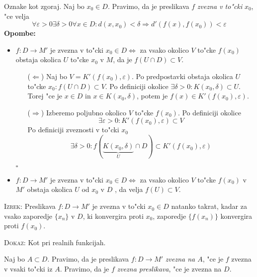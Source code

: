  Oznake kot zgoraj. Naj bo $x_0 \in D$. Pravimo, da je preslikava $f$ \emph{zvezna v to"cki} $x_0$, "ce velja
\begin{equation*}
\forall \varepsilon > 0 \exists \delta > 0 \forall x \in D: d(x, x_0) < \delta \Rightarrow d'(f(x), f(x_0)) < \varepsilon
\end{equation*}
\textbf{Opombe:}
\begin{itemize}
    \item $f: D \to M'$ je zvezna v to"cki $x_0 \in D \iff$ za vsako okolico $V$ to"cke $f(x_0)$ obstaja okolica $U$ to"cke $x_0$ v $M$, da je $f(U \cap D) \subset V$.
    \begin{itemize}
        \item[($\Leftarrow$)] Naj bo $V = K'(f(x_0), \varepsilon)$. Po predpostavki obstaja okolica $U$ to"cke $x_0: f(U \cap D) \subset V$. Po definiciji okolice $\exists \delta > 0: K(x_0, \delta) \subset U$. Torej "ce je $x \in D$ in $x \in K(x_0, \delta)$, potem je $f(x) \in K'(f(x_0), \varepsilon)$.
        
        \item[($\Rightarrow$)] Izberemo poljubno okolico $V$ to"cke $f(x_0)$. Po definiciji okolice
        \begin{equation*}
        \exists \varepsilon > 0: K'(f(x_0), \varepsilon) \subset V
        \end{equation*}
        Po definiciji zveznosti v to"cki $x_0$
        \begin{equation*}
        \exists \delta > 0: f(\underbrace{K(x_0, \delta)}_U \cap D) \subset K'(f(x_0), \varepsilon)
        \end{equation*}
    \end{itemize}
    \hfill $\square$
    
    \item $f: D \to M'$ je zvezna v to"cki $x_0 \in D \iff$ za vsako okolico $V$ to"cke $f(x_0)$ v $M'$ obstaja okolica $U$ od $x_0$ v $D$ , da velja $f(U) \subset V$.
\end{itemize}
%
\textsc{Izrek:} Preslikava $f: D \to M'$ je zvezna v to"cki $x_0 \in D$ natanko takrat, kadar za vsako zaporedje $\{ x_n \}$ v $D$, ki konvergira proti $x_0$, zaporedje $\{ f(x_n) \}$ konvergira proti $f(x_0)$.

\textsc{Dokaz:} Kot pri realnih funkcijah.

 Naj bo $A \subset D$. Pravimo, da je preslikava $f: D \to M'$ \emph{zvezna na $A$}, "ce je $f$ zvezna v vsaki to"cki iz $A$. Pravimo, da je $f$ \emph{zvezna preslikava}, "ce je zvezna na $D$.

